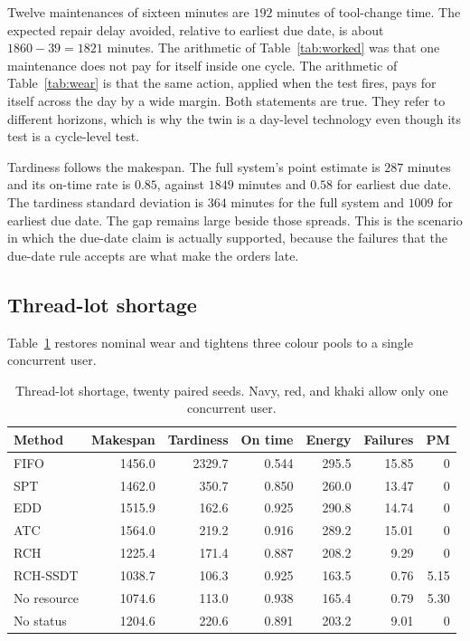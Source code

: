 Twelve maintenances of sixteen minutes are \(192\) minutes of tool-change time. The expected repair delay avoided, relative to earliest due date, is about \(1860 - 39 = 1821\) minutes. The arithmetic of Table~\ref{tab:worked} was that one maintenance does not pay for itself inside one cycle. The arithmetic of Table~\ref{tab:wear} is that the same action, applied when the test fires, pays for itself across the day by a wide margin. Both statements are true. They refer to different horizons, which is why the twin is a day-level technology even though its test is a cycle-level test.

Tardiness follows the makespan. The full system's point estimate is \(287\) minutes and its on-time rate is \(0.85\), against \(1849\) minutes and \(0.58\) for earliest due date. The tardiness standard deviation is \(364\) minutes for the full system and \(1009\) for earliest due date. The gap remains large beside those spreads. This is the scenario in which the due-date claim is actually supported, because the failures that the due-date rule accepts are what make the orders late.

\subsection{Thread-lot shortage}

Table~\ref{tab:shortage} restores nominal wear and tightens three colour pools to a single concurrent user.

\begin{table}[ht]
\centering
\caption{Thread-lot shortage, twenty paired seeds. Navy, red, and khaki allow only one concurrent user.}
\label{tab:shortage}
\small
\begin{tabular}{lrrrrrr}
\toprule
Method & Makespan & Tardiness & On time & Energy & Failures & PM \\
\midrule
FIFO & 1456.0 & 2329.7 & 0.544 & 295.5 & 15.85 & 0 \\
SPT & 1462.0 & 350.7 & 0.850 & 260.0 & 13.47 & 0 \\
EDD & 1515.9 & 162.6 & 0.925 & 290.8 & 14.74 & 0 \\
ATC & 1564.0 & 219.2 & 0.916 & 289.2 & 15.01 & 0 \\
RCH & 1225.4 & 171.4 & 0.887 & 208.2 & 9.29 & 0 \\
RCH-SSDT & 1038.7 & 106.3 & 0.925 & 163.5 & 0.76 & 5.15 \\
No resource & 1074.6 & 113.0 & 0.938 & 165.4 & 0.79 & 5.30 \\
No status & 1204.6 & 220.6 & 0.891 & 203.2 & 9.01 & 0 \\
\bottomrule
\end{tabular}
\end{table}

